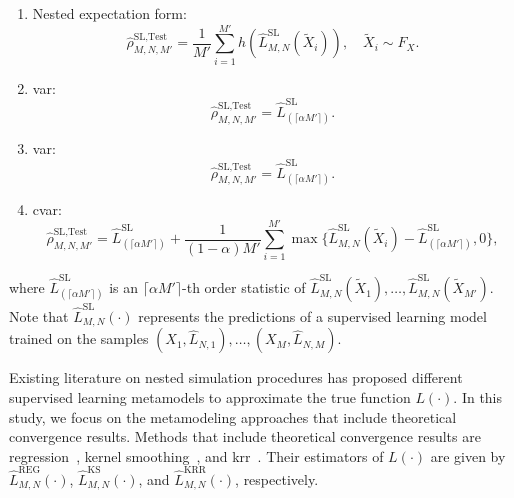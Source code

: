 \begin{enumerate}
    \item   Nested expectation form:
            \begin{equation}\label{eq1:sl-test}
            \hat{\rho}^{\text{SL}, \text{Test}}_{M, N, M'} = \frac{1}{M'} \sum_{i=1}^{M'} h(\hat{L}^{\text{SL}}_{M, N}(\tilde{X}_i)), \quad \tilde{X}_i \sim F_X.
            \end{equation}
    \item   \gls{var}:
            \begin{equation*}
              \hat{\rho}^{\text{SL}, \text{Test}}_{M, N, M'} = \hat{L}^{\text{SL}}_{(\lceil \alpha M' \rceil)}.  
            \end{equation*}
    \item   \gls{var}:
            \begin{equation*}
              \hat{\rho}^{\text{SL}, \text{Test}}_{M, N, M'} = \hat{L}^{\text{SL}}_{(\lceil \alpha M' \rceil)}.  
            \end{equation*}
    \item   \gls{cvar}:
            \begin{equation*}
                \hat{\rho}^{\text{SL}, \text{Test}}_{M, N, M'} 
                = \hat{L}^{\text{SL}}_{(\lceil \alpha M' \rceil)} 
                + \frac{1}{(1-\alpha) M'} \sum_{i=1}^{M'} \max \{\hat{L}^{\text{SL}}_{M, N}(\tilde{X}_i) - \hat{L}^{\text{SL}}_{(\lceil \alpha M' \rceil)}, 0 \}, 
            \end{equation*}
\end{enumerate}
where $\hat{L}^{\text{SL}}_{(\lceil \alpha M' \rceil)}$ is an $\lceil \alpha M' \rceil$-th order statistic of $\hat{L}^{\text{SL}}_{M, N}(\tilde{X}_1), \dots, \hat{L}^{\text{SL}}_{M, N}(\tilde{X}_{M'})$. 
Note that $\hat{L}^{\text{SL}}_{M, N}(\cdot)$ represents the predictions of a supervised learning model trained on the samples $(X_1, \hat{L}_{N, 1}), \dots, (X_M, \hat{L}_{N, M})$.

Existing literature on nested simulation procedures has proposed different supervised learning metamodels to approximate the true function $L(\cdot)$.
In this study, we focus on the metamodeling approaches that include theoretical convergence results.
Methods that include theoretical convergence results are regression~\citep{broadie2015risk}, kernel smoothing~\citep{hong2017kernel}, and \gls{krr}~\citep{wang2022smooth}.
Their estimators of $L(\cdot)$ are given by $\hat{L}^{\text{REG}}_{M, N}(\cdot)$, $\hat{L}^{\text{KS}}_{M, N}(\cdot)$, and $\hat{L}^{\text{KRR}}_{M, N}(\cdot)$, respectively.

